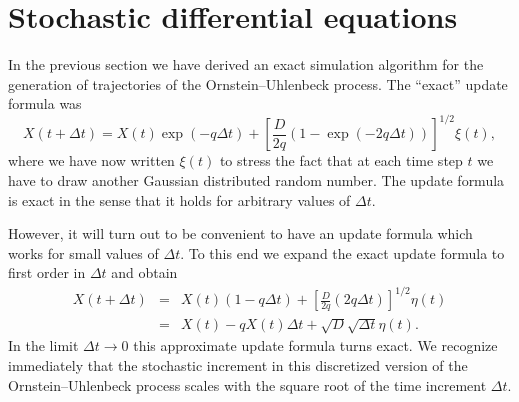 \chapter{Stochastic differential equations}
In the previous section we have derived an exact simulation algorithm
for the generation of trajectories of the Ornstein--Uhlenbeck process.
The ``exact'' update formula was
\begin{equation*}
X(t+\Delta t) = X(t) \exp(-q \Delta t) +
  \left[ \frac{D}{2q}(1-\exp(-2q\Delta t)) \right]^{1/2} \xi(t),
\end{equation*}
where we have now written $\xi(t)$ to stress the fact that at each
time step $t$ we have to draw another Gaussian distributed random 
number. The update formula is exact in the sense that it holds for
arbitrary values of $\Delta t$.

However, it will turn out to be convenient to have an update formula
which works for small values of $\Delta t$. To this end we expand the
exact update formula to first order in $\Delta t$ and obtain
\begin{eqnarray}
X(t+\Delta t)& =& X(t) (1- q \Delta t) + 
   \left[ \frac{D}{2q} (2q \Delta t) \right]^{1/2} \eta(t) \nonumber
   \\
\label{SDE_APPROX} 
  & = & X(t) - qX(t) \Delta t + \sqrt{D} \sqrt{\Delta t} \eta(t).
\end{eqnarray}
In the limit $\Delta t \rightarrow 0$ this approximate update formula
turns exact.  We recognize immediately that the stochastic increment in
this discretized version of the Ornstein--Uhlenbeck process scales
with the square root of the time increment $\Delta t$.

